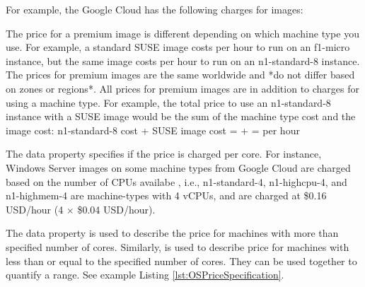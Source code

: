 For example, the Google Cloud has the following charges for images:
\begin{displayquote}
The price for a premium image is different depending on which machine type you use. For example, a standard SUSE image costs  per hour to run on an f1-micro instance, but the same image costs  per hour to run on an n1-standard-8 instance. The prices for premium images are the same worldwide and *do not differ based on zones or regions*.
All prices for premium images are in addition to charges for using a machine type. For example, the total price to use an n1-standard-8 instance with a SUSE image would be the sum of the machine type cost and the image cost:
n1-standard-8 cost + SUSE image cost =  +  =  per hour
\end{displayquote}

The data property  specifies if the price is charged per core.
For instance, Windows Server images on some machine types from Google Cloud are charged based on the number of CPUs availabe \cite{gcloud_price}, i.e., n1-standard-4, n1-highcpu-4, and n1-highmem-4 are machine-types with 4 vCPUs,
and are charged at \$0.16 USD/hour (4 $\times$ \$0.04 USD/hour).

The data property  is used to describe the price for machines with more than specified number of cores. 
Similarly,  is used to describe price for machines with less than or
equal to the specified number of cores.
They can be used together to quantify a range.
See example Listing \ref{lst:OSPriceSpecification}.

